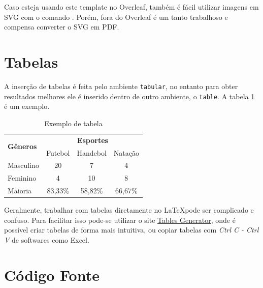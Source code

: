     Caso esteja usando este template no Overleaf, também é fácil utilizar imagens em SVG com o comando \lstinline[language=TeX, style=Code]||.
    Porém, fora do Overleaf é um tanto trabalhoso e compensa converter o SVG em PDF.


\section{Tabelas}
\label{sec:tabelas}

    A inserção de tabelas é feita pelo ambiente \lstinline[language=TeX, style=Code]|tabular|, no entanto para obter resultados melhores ele é inserido dentro de outro ambiente, o \lstinline[language=TeX, style=Code]|table|.
    A tabela \ref{tab:e7} é um exemplo.


    \begin{table}[htb]
        \centering
        \caption{Exemplo de tabela}
        \label{tab:e7}
        \begin{tabular}{l|ccc}
            \hline
            \multirow{2}{*}{\textbf{Gêneros}} & \multicolumn{3}{c}{\textbf{Esportes}} \\ \cline{2-4} 
                                              & Futebol    & Handebol    & Natação    \\ \hline
            Masculino                         & 20         & 7           & 4          \\
            Feminino                          & 4          & 10          & 8          \\ \hline
            Maioria                           & 83,33\%    & 58,82\%     & 66,67\%    \\ \hline
            \end{tabular}
    \end{table}

    Geralmente, trabalhar com tabelas diretamente no \LaTeX pode ser complicado e confuso.
    Para facilitar isso pode-se utilizar o site \href{https://www.tablesgenerator.com}{Tables Generator}, onde é possível criar tabelas de forma mais intuitiva, ou copiar tabelas com \textit{Ctrl C - Ctrl V} de softwares como Excel.


\section{Código Fonte}
\label{sec:codigo}

